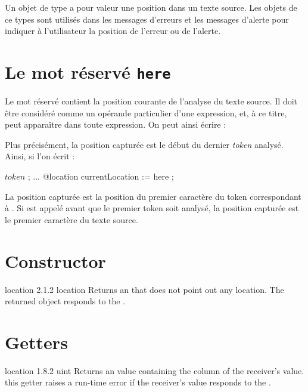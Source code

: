 

Un objet de type  a pour valeur une position dans un texte source. Les objets de ce types sont utilisés dans les messages d'erreurs et les messages d'alerte pour indiquer à l'utilisateur la position de l'erreur ou de l'alerte.





\section{Le mot réservé \texttt{here}}

Le mot réservé  contient la position courante de l'analyse du texte source. Il doit être considéré comme un opérande particulier d'une expression, et, à ce titre, peut apparaître dans toute expression. On peut ainsi écrire :


Plus précisément, la position capturée est le début du dernier \emph{token} analysé. Ainsi, si l'on écrit :

\begin{galgascode}
  $token$ ;
  ...
  @location currentLocation := here ;
\end{galgascode}

La position capturée est la position du premier caractère du token correspondant à . Si  est appelé avant que le premier token soit analysé, la position capturée est le premier caractère du texte source.

\section{Constructor}

{location}
{2.1.2}
{location}
{Returns an  that does not point out any location.}
{The returned object responds  to the .}

\section{Getters}

{location}
{1.8.2}
{uint}
{Returns an  value containing the column of the receiver's value.}
{this getter raises a run-time error if the receiver's value responds  to the .}


